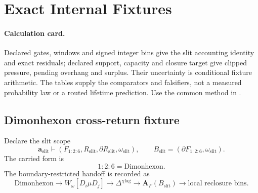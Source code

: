 

\section{Exact Internal Fixtures}\label{manual:cross-return-short-window}

\paragraph{Calculation card.}
Declared gates, windows and signed integer bins give the slit accounting
identity and exact residuals; declared support, capacity and closure target
give clipped pressure, pending overhang and surplus. Their uncertainty is
conditional fixture arithmetic. The tables supply the comparators and
falsifiers, not a measured probability law or a routed lifetime prediction.
Use the common method in .



\subsection{Dimonhexon cross-return fixture}\label{manual:cross-return:dimonhexon-slit}

Declare the slit scope
\[
\mathbf a_{\mathrm{slit}}
\vdash
(F_{1{:}2{:}6},R_{\mathrm{slit}},\partial R_{\mathrm{slit}},\omega_{\mathrm{slit}}),
\qquad
B_{\mathrm{slit}}=(\partial F_{1{:}2{:}6},\omega_{\mathrm{slit}}).
\]
The carried form is
\[
1{:}2{:}6=\mathrm{Dimonhexon}.
\]
The boundary-restricted handoff is recorded as
\[
\mathrm{Dimonhexon}
\longrightarrow
W_{\omega}[D_i\mu D_j]
\longrightarrow
\Delta^{\chi\mathrm{lag}}
\longrightarrow
\mathbf A_F(B_{\mathrm{slit}})
\longrightarrow
\text{local reclosure bins}.
\]

